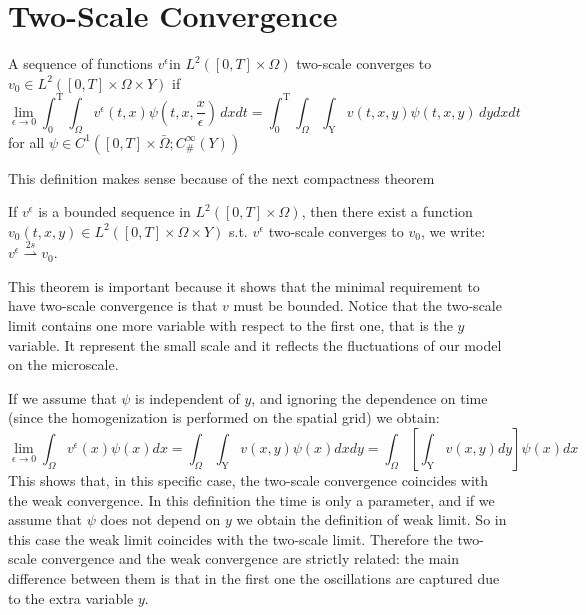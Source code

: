 \section{Two-Scale Convergence}

\begin{definition}
A sequence of functions $ v ^ {\epsilon } $in $ L^2([ 0 ,T]\times\Omega) $ two-scale converges to $v_{0} \in L^2([ 0 ,T]\times\Omega \times Y)$ if
$$
\lim_{\epsilon \to 0} \int_{0}^{\textrm{T}} \int_{\Omega} v^{\epsilon}(t,x)\psi\left(t,x,\frac{x}{\epsilon}\right) \, dxdt=\int_{0}^{\textrm{T}} \int_{\Omega} \int_{\textrm{Y}} v(t,x,y)\psi(t,x,y) \, dydxdt
$$ 
for all $\psi \in C^1([0,T]\times \bar\Omega;C_{\#}^{\infty}(Y))$
\label{def 7.1}\end{definition}
This definition makes sense because of the next compactness theorem 
\begin{theorem}
If $v^{\epsilon}$ is a bounded sequence in $ L^2([ 0 ,T]\times\Omega) $, then there exist a function $v_{0}(t,x,y) \in   L^2([0,T]\times\Omega \times Y)$ s.t. $v^{\epsilon}$ two-scale converges to $v_{0}$, we write: 
$v^{\epsilon} \overset{2s}{\rightharpoonup} v_{0}$.
\label{thm 7.1}\end{theorem}
This theorem is important because it shows that the minimal requirement to have two-scale convergence is that $v$ must be bounded. Notice that the two-scale limit contains one more variable with respect to the first one, that is the $y$ variable. It represent the small scale and it reflects the fluctuations of our model on the microscale.
\begin{remark} If we assume that $\psi$ is independent of $y$, and ignoring the dependence on time (since the homogenization is performed on the spatial grid) we obtain:
$$ 
\lim_{\epsilon \to 0} \int_{\Omega} v^{\epsilon}(x)\psi(x)dx= \int_{\Omega} \int_{\textrm{Y}} v(x,y)\psi(x)dxdy=\int_{\Omega} \left[\int_{\textrm{Y}} v(x,y)dy\right]\psi(x)dx
$$This shows that, in this specific case, the two-scale convergence coincides with the weak convergence.
In this definition the time is only a parameter, and if we assume that $\psi$ does not depend on $y$ we obtain the definition of weak limit. So in this case the weak limit coincides with the two-scale limit. Therefore the two-scale convergence and the weak convergence are strictly related: the main difference between them is that in the first one the oscillations are captured due to the extra variable $y$.
\end{remark}
